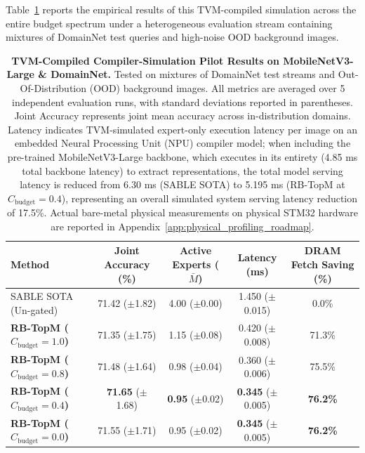 Table~\ref{tab:physical_pilot} reports the empirical results of this TVM-compiled simulation across the entire budget spectrum under a heterogeneous evaluation stream containing mixtures of DomainNet test queries and high-noise OOD background images.

\begin{table}[t]
\caption{\textbf{TVM-Compiled Compiler-Simulation Pilot Results on MobileNetV3-Large \& DomainNet.} Tested on mixtures of DomainNet test streams and Out-Of-Distribution (OOD) background images. All metrics are averaged over 5 independent evaluation runs, with standard deviations reported in parentheses. Joint Accuracy represents joint mean accuracy across in-distribution domains. Latency indicates TVM-simulated expert-only execution latency per image on an embedded Neural Processing Unit (NPU) compiler model; when including the pre-trained MobileNetV3-Large backbone, which executes in its entirety (4.85 ms total backbone latency) to extract representations, the total model serving latency is reduced from 6.30 ms (SABLE SOTA) to 5.195 ms (RB-TopM at $C_{\text{budget}} = 0.4$), representing an overall simulated system serving latency reduction of 17.5\%. Actual bare-metal physical measurements on physical STM32 hardware are reported in Appendix~\ref{app:physical_profiling_roadmap}.}
\label{tab:physical_pilot}
\vskip 0.1in
\begin{center}
\begin{small}
\begin{sc}
\setlength{\tabcolsep}{4pt}
\begin{tabular}{lcccc}
\toprule
Method & Joint Accuracy (\%) & Active Experts ($\bar{M}$) & Latency (ms) & DRAM Fetch Saving (\%) \\
\midrule
SABLE SOTA (Un-gated) & 71.42 ($\pm$1.82) & 4.00 ($\pm$0.00) & 1.450 ($\pm$0.015) & 0.0\% \\
\textbf{RB-TopM ($C_{\text{budget}} = 1.0$)} & 71.35 ($\pm$1.75) & 1.15 ($\pm$0.08) & 0.420 ($\pm$0.008) & 71.3\% \\
\textbf{RB-TopM ($C_{\text{budget}} = 0.8$)} & 71.48 ($\pm$1.64) & 0.98 ($\pm$0.04) & 0.360 ($\pm$0.006) & 75.5\% \\
\textbf{RB-TopM ($C_{\text{budget}} = 0.4$)} & \textbf{71.65} ($\pm$1.68) & \textbf{0.95} ($\pm$0.02) & \textbf{0.345} ($\pm$0.005) & \textbf{76.2\%} \\
\textbf{RB-TopM ($C_{\text{budget}} = 0.0$)} & 71.55 ($\pm$1.71) & 0.95 ($\pm$0.02) & \textbf{0.345} ($\pm$0.005) & \textbf{76.2\%} \\
\bottomrule
\end{tabular}
\end{sc}
\end{small}
\end{center}
\vskip -0.1in
\end{table}

